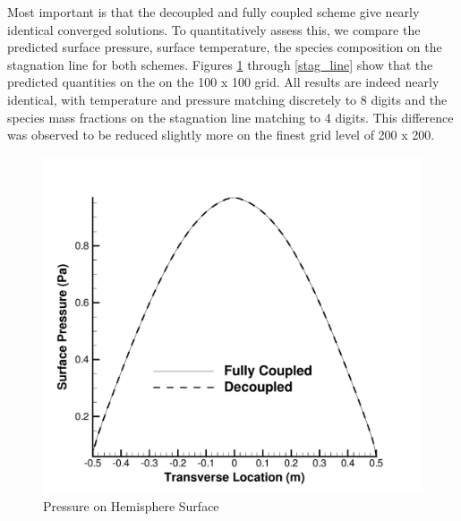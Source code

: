 \documentclass[]{aiaa-tc}%
\begin{document}
Most important is that the decoupled and fully coupled scheme give nearly identical converged solutions.  To quantitatively assess this, we compare the predicted surface pressure, surface temperature, the species composition on the stagnation line for both schemes.  Figures \ref{surf_press} through  \ref{stag_line} show that the predicted quantities on the on the 100 x 100 grid. All results are indeed nearly identical, with temperature and pressure matching discretely to 8 digits and the species mass fractions on the stagnation line matching to 4 digits.  This difference was observed to be reduced slightly more on the finest grid level of 200 x 200.
%
\begin{figure}
\begin{center}
\includegraphics{surface_pressure}
\caption{Pressure on Hemisphere Surface}
\label{surf_press}
\end{center}
\end{figure}
%
\end{document}
